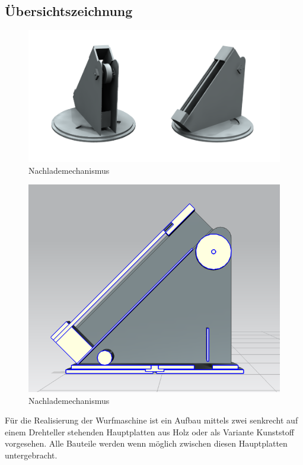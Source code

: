 \subsection{Übersichtszeichnung}

\begin{figure}[h!]
	\centering
	\includegraphics[scale=0.5]{../../fig/Studio.png}
	\caption{Nachlademechanismus}
\end{figure}
\begin{figure}[h!]
	\centering
	\includegraphics[scale=0.5]{../../fig/Schnittansicht.png}
	\caption{Nachlademechanismus}
\end{figure}
Für die Realisierung der Wurfmaschine ist ein Aufbau mittels zwei senkrecht auf einem Drehteller stehenden Hauptplatten aus Holz oder als Variante Kunststoff vorgesehen. Alle Bauteile werden wenn möglich zwischen diesen Hauptplatten untergebracht.
